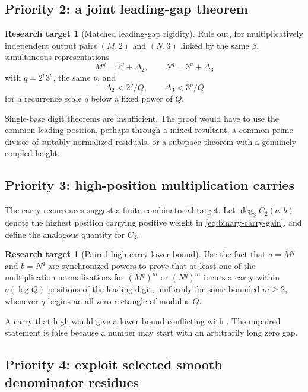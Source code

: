 \documentclass[11pt]{article}
\theoremstyle{definition}
\newtheorem{problem}[theorem]{Research target}
\theoremstyle{remark}
\begin{document}
\subsection{Priority 2: a joint leading-gap theorem}

\begin{problem}[Matched leading-gap rigidity]
Rule out, for multiplicatively independent output pairs $(M,2)$ and $(N,3)$ linked
by the same $\beta$, simultaneous representations
\[
 M^q=2^\nu+\Delta_2,
 \qquad
 N^q=3^\nu+\Delta_3
\]
with $q=2^r3^s$, the same $\nu$, and
\[
 \Delta_2<2^\nu/Q,
 \qquad
 \Delta_3<3^\nu/Q
\]
for a recurrence scale $q$ below a fixed power of $Q$.
\end{problem}

Single-base digit theorems are insufficient.  The proof would have to use the common
leading position, perhaps through a mixed resultant, a common prime divisor of
suitably normalized residuals, or a subspace theorem with a genuinely coupled
height.

\subsection{Priority 3: high-position multiplication carries}

The carry recurrences suggest a finite combinatorial target.  Let
$\deg_3 C_2(a,b)$ denote the highest position carrying positive weight in
\eqref{eq:binary-carry-gain}, and define the analogous quantity for $C_3$.

\begin{problem}[Paired high-carry lower bound]
Use the fact that $a=M^q$ and $b=N^q$ are synchronized powers to prove that at least
one of the multiplication normalizations for $(M^q)^m$ or $(N^q)^m$ incurs a carry
within $o(\log Q)$ positions of the leading digit, uniformly for some bounded
$m\ge2$, whenever $q$ begins an all-zero rectangle of modulus $Q$.
\end{problem}

A carry that high would give a lower bound conflicting with
.  The unpaired statement is false because a number may
start with an arbitrarily long zero gap.

\subsection{Priority 4: exploit selected smooth denominator residues}
\end{document}
